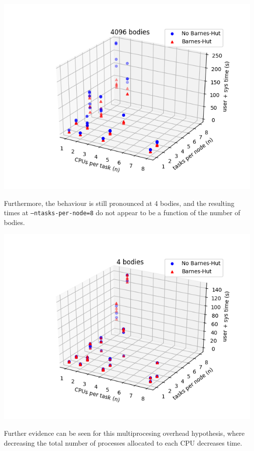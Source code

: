 \documentclass[11pt,a4paper]{article}
\begin{document}
\includegraphics[width=14.2cm]{4096-cpusPerTask-tasksPerNode}

Furthermore, the behaviour is still pronounced at 4 bodies, and the resulting times at \texttt{--ntasks-per-node=8} do not appear to be a function of the number of bodies.

\includegraphics[width=14.2cm]{4-cpusPerTask-tasksPerNode}

Further evidence can be seen for this multiprocesing overhead hypothesis, where decreasing the total number of processes allocated to each CPU decreases time.
\end{document}
